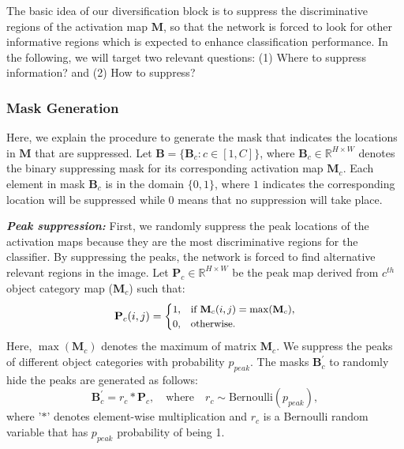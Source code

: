 \documentclass[letterpaper]{article} \usepackage{aaai20}  \usepackage{times}  \usepackage{helvet} \usepackage{courier}  \usepackage[hyphens]{url}  \usepackage{graphicx} \usepackage{multirow}
\begin{document}
The basic idea of our diversification block is to suppress the discriminative regions of the activation map $\mathbf{M}$, so that the network is forced to look for other informative regions which is expected to enhance classification performance. In the following, we will target two relevant questions: (1) Where to suppress information? and (2) How to suppress?

\subsubsection{Mask Generation} \label{sup_loca}
Here, we explain the procedure to generate the mask that indicates the locations in $\mathbf{M}$ that are suppressed. Let $\mathbf{B} = \{\mathbf{B}_c : c \in [1,C]\}$, where $\mathbf{B}_c \in \mathbb{R}^{H\times W}$ denotes the binary suppressing mask for its corresponding activation map $\mathbf{M}_c$. Each element in mask $\mathbf{B}_c$ is in the domain $\{0,1\}$, where $1$ indicates the corresponding location will be suppressed while $0$ means that no suppression will take place.

\textbf{\textit{Peak suppression:}} First, we randomly suppress the peak locations of the activation maps because they are the most discriminative regions for the classifier. By suppressing the peaks, the network is forced to find alternative relevant regions in the image. Let ${\mathbf{P}}_{c}  \in \mathbb{R}^{H\times W}$ be the peak map derived from $c^{th}$ object category map ($\mathbf{M}_{c}$) such that:
\begin{equation}
\small
 {\mathbf{P}}_{c}(i,j)=\begin{cases}
    1,&\text{if $\mathbf{M}_{c}(i,j)=\max(\mathbf{M}_{c}$}),\\
    0, & \text{otherwise}.
  \end{cases}
\end{equation}
Here, $\max(\mathbf{M}_{c})$ denotes the maximum of matrix $\mathbf{M}_{c}$. We suppress the peaks of different object categories with probability $p_{peak}$. The masks $\mathbf{B}^{'}_{c}$ to randomly hide the peaks are generated as follows:
\begin{equation}
    \mathbf{B}^{'}_{c} = r_c * {\mathbf{P}}_{c}, \quad \text{where} \quad r_c \sim \text{Bernoulli}(p_{peak}),
\end{equation}
where '$*$' denotes element-wise multiplication and $r_c$ is a Bernoulli random variable that has $p_{peak}$ probability of being 1.
\end{document}
